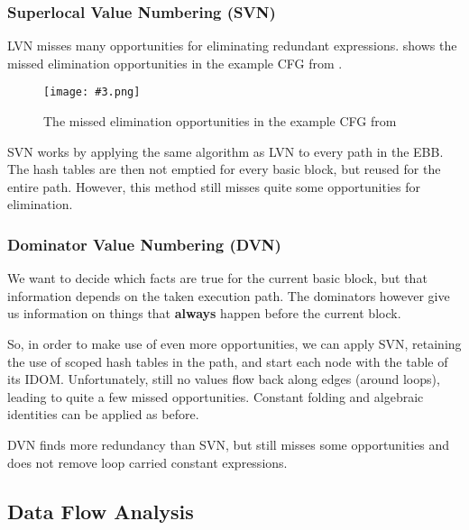 \documentclass{article}
\newcommand{\fig}[4]{
	\begin{figure}[#1]
		\center
		\texttt{[image: \#3.png]}
		\caption{#4}
		\label{fig:#3}
	\end{figure}
	}
\begin{document}
\subsubsection{Superlocal Value Numbering (SVN)}
LVN misses many opportunities for eliminating redundant expressions.
 shows the missed elimination opportunities in the example CFG from .

\fig{h}{0.7}{missedops}{The missed elimination opportunities in the example CFG from \Cref{cfg}}

SVN works by applying the same algorithm as LVN to every path in the EBB.
The hash tables are then not emptied for every basic block, but reused for the entire path.
However, this method still misses quite some opportunities for elimination.

\subsubsection{Dominator Value Numbering (DVN)}
We want to decide which facts are true for the current basic block, but that information depends on the taken execution path.
The dominators however give us information on things that \textbf{always} happen before the current block.

So, in order to make use of even more opportunities, we can apply SVN, retaining the use of scoped hash tables in the path, and start each node with the table of its IDOM.
Unfortunately, still no values flow back along edges (around loops), leading to quite a few missed opportunities.
Constant folding and algebraic identities can be applied as before.

DVN finds more redundancy than SVN, but still misses some opportunities and does not remove loop carried constant expressions.

\subsection{Data Flow Analysis}
\end{document}
